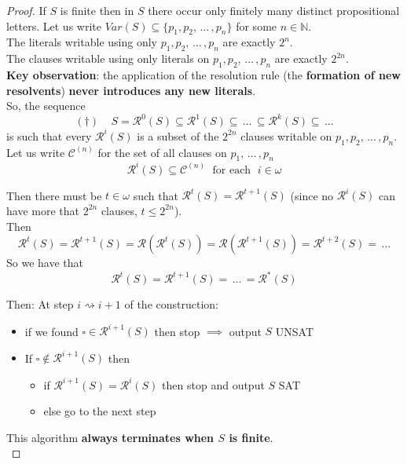 \begin{proof}
	If $S$ is finite then in $S$ there occur only finitely many distinct propositional letters. Let us write $Var (S) \subseteq \{p_1, p_2, \, \dots \, , p_n\}$ for some $n \in \mathbb{N}$.\\
	
	The literals writable using only $p_1, p_2, \, \dots \, , p_n$ are exactly $2^n$.\\
	The clauses writable using only literals on $p_1, p_2, \, \dots \, , p_n$ are exactly $2^{2n}$.\\
	
	\textbf{Key observation}: the application of the resolution rule (the \textbf{formation of new resolvents}) \textbf{never introduces any new literals}.\\
	
	So, the sequence
	$$(\dag) \;\;\;\; S = \mathcal{R}^0 (S) \subseteq \mathcal{R}^1 (S) \subseteq  \, \dots \, \subseteq \mathcal{R}^k (S) \subseteq \, \dots $$
	is such that every $\mathcal{R}^i (S)$ is a subset of the $2^{2n}$ clauses writable on $p_1, p_2, \, \dots \, , p_n$.\\
	
	Let us write $\mathcal{C}^{(n)}$ for the set of all clauses on $p_1, \, \dots \, , p_n$
	$$ \mathcal{R}^i (S)  \subseteq \mathcal{C}^{(n)} \; \text{ for each } \; i \in \omega $$
	
	Then there must be $t \in \omega$ such that $\mathcal{R}^t (S) = \mathcal{R}^{t+1} (S)$ (since no $\mathcal{R}^i (S)$ can have more that $2^{2n}$ clauses, $t \leq 2^{2n}$).\\
	
	Then 
	$$ \mathcal{R}^t (S) = \mathcal{R}^{t+1} (S) = \mathcal{R} \left(\mathcal{R}^t(S)\right) = \mathcal{R} \left(\mathcal{R}^{t+1} (S)\right) = \mathcal{R}^{t+2} (S) = \, \dots $$
	So we have that 
	$$ \mathcal{R}^t (S) = \mathcal{R}^{t+1} (S)  = \, \dots \, = \mathcal{R}^\ast (S) $$
	
	Then: At step $i \rightsquigarrow i+1$ of the construction: 
	\begin{itemize}
		\item if we found $\square \in \mathcal{R}^{i+1} (S)$ then stop $\implies$ output $S$ UNSAT
		\item If $\square \notin \mathcal{R}^{i+1} (S)$ then 
		\begin{itemize}
			\item if $\mathcal{R}^{i+1} (S) = \mathcal{R}^i (S)$ then stop and output $S$ SAT
			\item else go to the next step
		\end{itemize}
	\end{itemize}
	
	This algorithm \textbf{always terminates when $S$ is finite}.\\
\end{proof}

